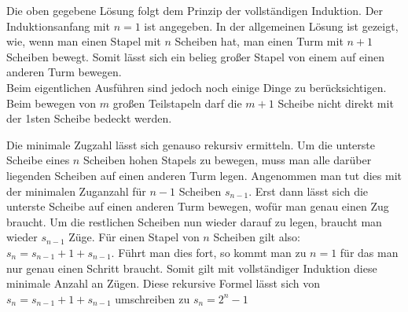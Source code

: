 \documentclass{article}
\begin{document}
                Die oben gegebene Lösung folgt dem Prinzip der vollständigen Induktion. Der Induktionsanfang mit \(n=1\) ist angegeben.
                In der allgemeinen Lösung ist gezeigt, wie, wenn man einen Stapel mit \(n\) Scheiben hat, man einen Turm mit \(n+1\) Scheiben bewegt.
                Somit lässt sich ein belieg großer Stapel von einem auf einen anderen Turm bewegen. \\

                Beim eigentlichen Ausführen sind jedoch noch einige Dinge zu berücksichtigen. \\
                Beim bewegen von \(m\) großen Teilstapeln darf die \(m+1\) Scheibe nicht direkt mit der 1sten Scheibe bedeckt werden.

                Die minimale Zugzahl lässt sich genauso rekursiv ermitteln. Um die unterste Scheibe eines \(n\) Scheiben hohen Stapels zu bewegen,
                muss man alle darüber liegenden Scheiben auf einen anderen Turm legen. Angenommen man tut dies mit der minimalen Zuganzahl für
                \(n-1\) Scheiben \(s_{n-1}\). Erst dann lässt sich die unterste Scheibe auf einen anderen Turm bewegen, wofür man genau einen Zug braucht.
                Um die restlichen Scheiben nun wieder darauf zu legen, braucht man wieder \(s_{n-1}\) Züge.
                Für einen Stapel von \(n\) Scheiben gilt also: \(s_n = s_{n-1} + 1 + s_{n-1}\). Führt man dies fort, so kommt man zu \(n=1\) für das man
                nur genau einen Schritt braucht. Somit gilt mit vollständiger Induktion diese minimale Anzahl an Zügen.
                Diese rekursive Formel lässt sich von \(s_n = s_{n-1} + 1 + s_{n-1}\) umschreiben zu \(s_n = 2^{n} - 1\)
\end{document}
